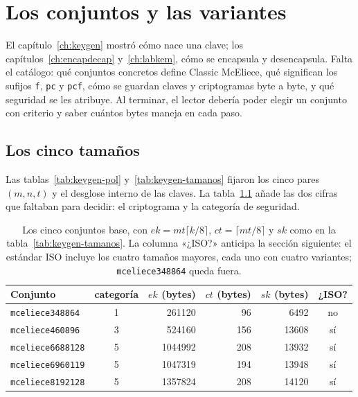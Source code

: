 \chapter{Los conjuntos y las variantes}\label{ch:parametros}

\begin{roadmap}
El capítulo~\ref{ch:keygen} mostró cómo nace una clave; los
capítulos~\ref{ch:encapdecap} y~\ref{ch:labkem}, cómo se encapsula y
desencapsula. Falta el catálogo: qué conjuntos concretos define Classic
McEliece, qué significan los sufijos \texttt{f}, \texttt{pc} y
\texttt{pcf}, cómo se guardan claves y criptogramas byte a byte, y qué
seguridad se les atribuye. Al terminar, el lector debería poder elegir
un conjunto con criterio y saber cuántos bytes maneja en cada paso.
\end{roadmap}

\section{Los cinco tamaños}\label{sec:param-cinco}

Las tablas~\ref{tab:keygen-pol} y~\ref{tab:keygen-tamanos} fijaron los
cinco pares $(m,n,t)$ y el desglose interno de las claves. La
tabla~\ref{tab:param-base} añade las dos cifras que faltaban para
decidir: el criptograma y la categoría de seguridad.

\begin{table}[htbp]
\centering
\small
\setlength{\tabcolsep}{7pt}
\begin{tabular}{lcrrrc}
\toprule
Conjunto & categoría & $ek$ (bytes) & $ct$ (bytes) & $sk$ (bytes) & ¿ISO?\\
\midrule
\texttt{mceliece348864} & 1 & \num{261120}  & 96  & \num{6492}  & no\\
\texttt{mceliece460896} & 3 & \num{524160}  & 156 & \num{13608} & sí\\
\texttt{mceliece6688128} & 5 & \num{1044992} & 208 & \num{13932} & sí\\
\texttt{mceliece6960119} & 5 & \num{1047319} & 194 & \num{13948} & sí\\
\texttt{mceliece8192128} & 5 & \num{1357824} & 208 & \num{14120} & sí\\
\bottomrule
\end{tabular}
\caption{Los cinco conjuntos base, con
$ek=mt\lceil k/8\rceil$, $ct=\lceil mt/8\rceil$ y $sk$ como en la
tabla~\ref{tab:keygen-tamanos}. La columna «¿ISO?» anticipa la
sección siguiente: el estándar ISO incluye los cuatro tamaños
mayores, cada uno con cuatro variantes; \texttt{mceliece348864} queda
fuera.}\label{tab:param-base}
\end{table}

